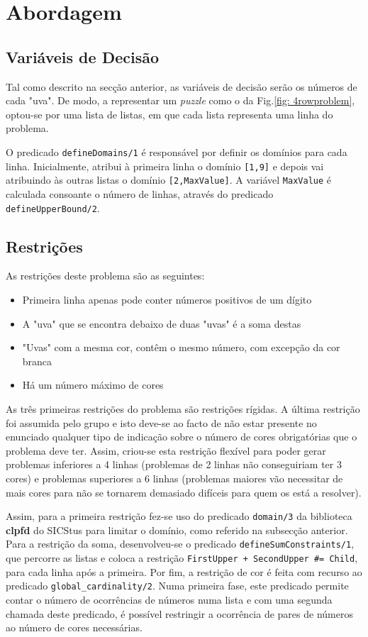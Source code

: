 \section{Abordagem}
\subsection{Variáveis de Decisão}

Tal como descrito na secção anterior, as variáveis de decisão serão os números de cada "uva".
De modo, a representar um \textit{puzzle} como o da Fig.\ref{fig: 4rowproblem}, optou-se por uma lista de listas, em que cada lista representa uma linha do problema.

O predicado \verb|defineDomains/1| é responsável por definir os domínios para cada linha. Inicialmente, atribui à primeira linha o domínio \verb|[1,9]| e depois vai atribuindo às outras listas o domínio \verb|[2,MaxValue]|. A variável \verb|MaxValue| é calculada consoante o número de linhas, através do predicado \verb|defineUpperBound/2|.

\subsection{Restrições}
As restrições deste problema são as seguintes:
\begin{itemize}
    \item Primeira linha apenas pode conter números positivos de um dígito
    \item A "uva" que se encontra debaixo de duas "uvas" é a soma destas
    \item "Uvas" com a mesma cor, contêm o mesmo número, com excepção da cor branca
    \item Há um número máximo de cores
\end{itemize}

As três primeiras restrições do problema são restrições rígidas.
A última restrição foi assumida pelo grupo e isto deve-se ao facto de não estar presente no enunciado qualquer tipo de indicação sobre o número de cores obrigatórias que o problema deve ter. Assim, criou-se esta restrição flexível para poder gerar problemas inferiores a 4 linhas (problemas de 2 linhas não conseguiriam ter 3 cores) e problemas superiores a 6 linhas (problemas maiores vão necessitar de mais cores para não se tornarem demasiado difíceis para quem os está a resolver).

Assim, para a primeira restrição fez-se uso do predicado \verb|domain/3| da biblioteca \textbf{clpfd} do SICStus para limitar o domínio, como referido na subsecção anterior.
Para a restrição da soma, desenvolveu-se o predicado \verb|defineSumConstraints/1|, que percorre as listas e coloca a restrição \verb|FirstUpper + SecondUpper #= Child|, para cada linha após a primeira.
Por fim, a restrição de cor é feita com recurso ao predicado \verb|global_cardinality/2|. Numa primeira fase, este predicado permite contar o número de ocorrências de números numa lista e com uma segunda chamada deste predicado, é possível restringir a ocorrência de pares de números ao número de cores necessárias.
